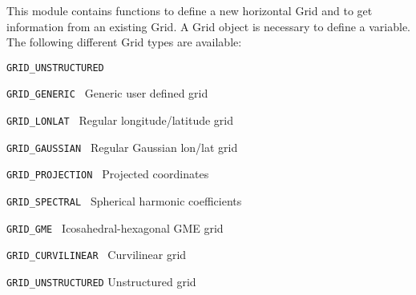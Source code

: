 This module contains functions to define a new horizontal Grid
and to get information from an existing Grid.
A Grid object is necessary to define a variable.
The following different Grid types are available:

\vspace*{3mm}
\hspace*{8mm}\begin{minipage}{15cm}
\begin{deflist}{\large\texttt{GRID\_UNSTRUCTURED \ \ }}
\item[\large\texttt{GRID\_GENERIC     }]  Generic user defined grid      
\item[\large\texttt{GRID\_LONLAT      }]  Regular longitude/latitude grid
\item[\large\texttt{GRID\_GAUSSIAN    }]  Regular Gaussian lon/lat grid
\item[\large\texttt{GRID\_PROJECTION  }]  Projected coordinates
\item[\large\texttt{GRID\_SPECTRAL    }]  Spherical harmonic coefficients
\item[\large\texttt{GRID\_GME         }]  Icosahedral-hexagonal GME grid    
\item[\large\texttt{GRID\_CURVILINEAR }]  Curvilinear grid
\item[\large\texttt{GRID\_UNSTRUCTURED}]  Unstructured grid
\end{deflist}
\end{minipage}
